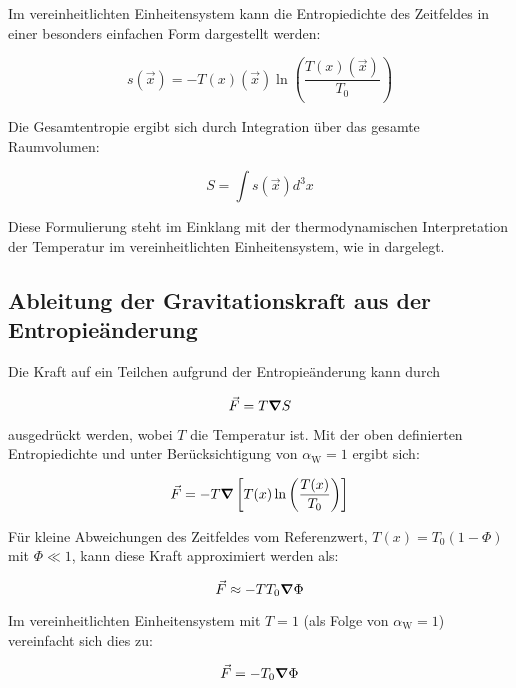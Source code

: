 \documentclass[12pt,a4paper]{article}
\newcommand{\Tfield}{T(x)}
\newcommand{\Tzero}{T_0}
\newcommand{\alphaW}{\alpha_{\text{W}}}
\newcommand{\vecx}{\vec{x}}
\begin{document}
	Im vereinheitlichten Einheitensystem kann die Entropiedichte des Zeitfeldes in einer besonders einfachen Form dargestellt werden:
	
	\begin{equation}
		s(\vecx) = -\Tfield(\vecx) \ln\left(\frac{\Tfield(\vecx)}{\Tzero}\right)
	\end{equation}
	
	Die Gesamtentropie ergibt sich durch Integration über das gesamte Raumvolumen:
	
	\begin{equation}
		S = \int s(\vecx) d^3x
	\end{equation}
	
	Diese Formulierung steht im Einklang mit der thermodynamischen Interpretation der Temperatur im vereinheitlichten Einheitensystem, wie in \cite{pascher_temp_2025} dargelegt.
	
	\subsection{Ableitung der Gravitationskraft aus der Entropieänderung}
	
	Die Kraft auf ein Teilchen aufgrund der Entropieänderung kann durch
	
	\begin{equation}
		\vec{F} = T \grad S
	\end{equation}
	
	ausgedrückt werden, wobei \(T\) die Temperatur ist. Mit der oben definierten Entropiedichte und unter Berücksichtigung von \(\alphaW = 1\) ergibt sich:
	
	\begin{equation}
		\vec{F} = -T \grad\left[\Tfield \ln\left(\frac{\Tfield}{\Tzero}\right)\right]
	\end{equation}
	
	Für kleine Abweichungen des Zeitfeldes vom Referenzwert, \(\Tfield = \Tzero(1 - \Phi)\) mit \(\Phi \ll 1\), kann diese Kraft approximiert werden als:
	
	\begin{equation}
		\vec{F} \approx -T \Tzero \grad \Phi
	\end{equation}
	
	Im vereinheitlichten Einheitensystem mit \(T = 1\) (als Folge von \(\alphaW = 1\)) vereinfacht sich dies zu:
	
	\begin{equation}
		\vec{F} = -\Tzero \grad \Phi
	\end{equation}
	
\end{document}
